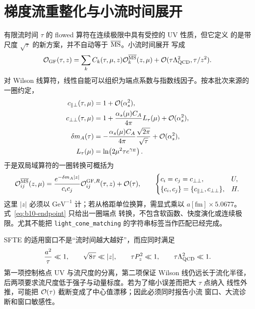 \section{梯度流重整化与小流时间展开}

有限流时间 $\tau$ 的 flowed 算符在连续极限中具有受控的 UV 性质，但它定义
的是带尺度 $\sqrt{\tau}$ 的新方案，并不自动等于 $\overline{\mathrm{MS}}$。小流时间展开
写成
\begin{equation}
  \mathcal O_{\mathrm{GF}}(\tau,z)
  =\sum_k C_k(\tau,\mu,z)\mathcal O_k^{\overline{\mathrm{MS}}}(z,\mu)
  +\mathcal O(\tau\Lambda_{\rm QCD}^2,\tau/z^2).
  \label{eq:b10-sfte}
\end{equation}
对 Wilson 线算符，线性自能可以组织为端点系数与指数线因子。按本批次来源的
一圈约定，
\begin{align}
  c_{\parallel\perp}(\tau,\mu)
  &=1+\mathcal O(\alpha_s^2),
  \label{eq:b10-cpara}\\
  c_{\perp\perp}(\tau,\mu)
  &=1+\frac{\alpha_s(\mu)C_A}{4\pi}L_\tau(\mu)
  +\mathcal O(\alpha_s^2),
  \label{eq:b10-cperp}\\
  \delta m_A(\tau)
  &=-\frac{\alpha_s(\mu)C_A}{4\pi}\frac{\sqrt{2\pi}}{\sqrt{\tau}}
  +\mathcal O(\alpha_s^2),
  \label{eq:b10-dm}\\
  L_\tau(\mu)&=\ln\!\left(2\mu^2\tau e^{\gamma_E}\right).
  \label{eq:b10-Ltau}
\end{align}
于是双局域算符的一圈转换可概括为
\begin{equation}
  \mathcal O_{ij}^{\overline{\mathrm{MS}}}(z,\mu)
  =\frac{e^{-\delta m_A|z|}}{c_i c_j}
  \mathcal O_{ij}^{\mathrm{GF},R}(\tau,z)+\mathcal O(\tau),
  \qquad
  \begin{cases}
    c_i=c_j=c_{\perp\perp}, & U,\\
    \{c_i,c_j\}=\{c_{\parallel\perp},c_{\perp\perp}\}, & H.
  \end{cases}
  \label{eq:b10-endpoint}
\end{equation}
这里 $|z|$ 必须以 $\mathrm{GeV}^{-1}$ 计；若从格距单位换算，需显式乘以
$a[\mathrm{fm}]\times5.0677$。式~\eqref{eq:b10-endpoint} 只给出一圈端点
转换，不包含软函数、快度演化或连续极限。尤其不能把
\texttt{light\_cone\_matching} 的字符串标签当作匹配已经完成。

SFTE 的适用窗口不是“流时间越大越好”，而应同时满足
\begin{equation}
  \frac{a^2}{\tau}\ll1,\qquad
  \sqrt{8\tau}\ll|z|,\qquad
  \tau P_z^2\ll1,\qquad
  \tau\Lambda_{\rm QCD}^2\ll1.
  \label{eq:b10-sfte-window}
\end{equation}
第一项控制格点 UV 与流尺度的分离，第二项保证 Wilson 线仍远长于流化半径，
后两项要求流尺度低于强子与动量标度。若为了缩小误差而把大 $\tau$ 点纳入
线性外推，可能把 $\mathcal O(\tau)$ 截断变成了中心值漂移；因此必须同时报告小流
窗口、大流诊断和窗口敏感性。

